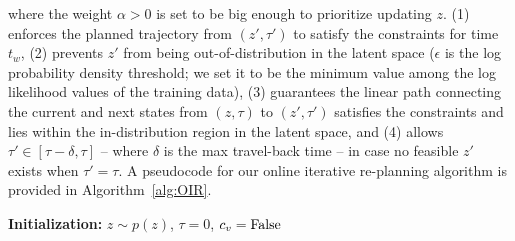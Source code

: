 where the weight $\alpha > 0$ is set to be big enough to prioritize updating $z$. (1) enforces the planned trajectory from $(z',\tau')$ to satisfy the constraints for time $t_w$, (2) prevents $z'$ from being out-of-distribution in the latent space ($\epsilon$ is the log probability density threshold; we set it to be the minimum value among the log likelihood values of the training data), (3) guarantees the linear path connecting the current and next states from $(z,\tau)$ to $(z',\tau')$ satisfies the constraints and lies within the in-distribution region in the latent space, and (4) allows $\tau' \in [\tau-\delta, \tau]$ -- where $\delta$ is the max travel-back time -- in case no feasible $z'$ exists when $\tau' = \tau$. 
A pseudocode for our online iterative re-planning algorithm is provided in Algorithm~\ref{alg:OIR}.
\begin{algorithm}[!t]
\caption{Online Iterative Trajectory Re-planning with MMP++}
\label{alg:OIR}
{\bf Initialization:} $z \sim p(z)$, $\tau=0$, $c_v={\rm False}$ \\
\end{algorithm}


